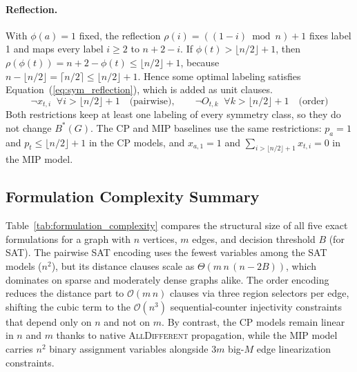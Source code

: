 \documentclass[a4paper,fleqn]{cas-sc}
\begin{document}
\paragraph{Reflection.} With $\phi(a)=1$ fixed, the reflection $\rho(i)=((1-i)\bmod n)+1$ fixes label 1 and maps every label $i\ge2$ to $n+2-i$. If $\phi(t)>\lfloor n/2\rfloor+1$, then $\rho(\phi(t))=n+2-\phi(t)\le\lfloor n/2\rfloor+1$, because $n-\lfloor n/2\rfloor=\lceil n/2\rceil\le\lfloor n/2\rfloor+1$. Hence some optimal labeling satisfies Equation~(\ref{eq:sym_reflection}), which is added as unit clauses.
\begin{equation}
    \neg x_{t,i}\;\;\forall i>\lfloor n/2\rfloor+1\quad\text{(pairwise)},\qquad \neg O_{t,k}\;\;\forall k>\lfloor n/2\rfloor+1\quad\text{(order)}
    \label{eq:sym_reflection}
\end{equation}
Both restrictions keep at least one labeling of every symmetry class, so they do not change $B^*(G)$. The CP and MIP baselines use the same restrictions: $p_a=1$ and $p_t\le\lfloor n/2\rfloor+1$ in the CP models, and $x_{a,1}=1$ and $\sum_{i>\lfloor n/2\rfloor+1}x_{t,i}=0$ in the MIP model.

\subsection{Formulation Complexity Summary}
\label{sec:complexity}

Table~\ref{tab:formulation_complexity} compares the structural size of all five exact formulations for a graph with $n$ vertices, $m$ edges, and decision threshold $B$ (for SAT). The pairwise SAT encoding uses the fewest variables among the SAT models ($n^2$), but its distance clauses scale as $\Theta(m\,n\,(n-2B))$, which dominates on sparse and moderately dense graphs alike. The order encoding reduces the distance part to $\mathcal{O}(m\,n)$ clauses via three region selectors per edge, shifting the cubic term to the $\mathcal{O}(n^3)$ sequential-counter injectivity constraints that depend only on $n$ and not on $m$. By contrast, the CP models remain linear in $n$ and $m$ thanks to native \textsc{AllDifferent} propagation, while the MIP model carries $n^2$ binary assignment variables alongside $3m$ big-$M$ edge linearization constraints.
\end{document}
